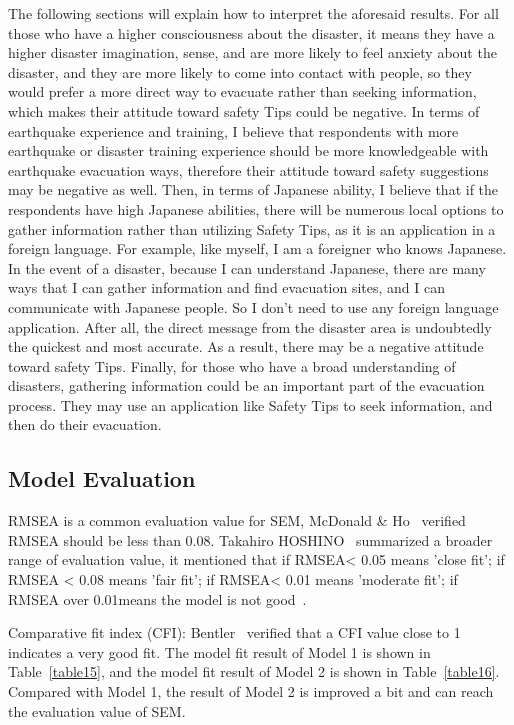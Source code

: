 The following sections will explain how to interpret the aforesaid results. For all those who have a higher consciousness about the disaster, it means they have a higher disaster imagination, sense, and are more likely to feel anxiety about the disaster, and they are more likely to come into contact with people, so they would prefer a more direct way to evacuate rather than seeking information, which makes their attitude toward safety Tips could be negative. In terms of earthquake experience and training, I believe that respondents with more earthquake or disaster training experience should be more knowledgeable with earthquake evacuation ways, therefore their attitude toward safety suggestions may be negative as well. Then, in terms of Japanese ability, I believe that if the respondents have high Japanese abilities, there will be numerous local options to gather information rather than utilizing Safety Tips, as it is an application in a foreign language. For example, like myself, I am a foreigner who knows Japanese. In the event of a disaster, because I can understand Japanese, there are many ways that I can gather information and find evacuation sites, and I can communicate with Japanese people. So I don't need to use any foreign language application. After all, the direct message from the disaster area is undoubtedly the quickest and most accurate. As a result, there may be a negative attitude toward safety Tips. Finally, for those who have a broad understanding of disasters, gathering information could be an important part of the evacuation process. They may use an application like Safety Tips to seek information, and then do their evacuation.

\subsection{Model Evaluation}
RMSEA is a common evaluation value for SEM, McDonald \& Ho~\cite{ref2} verified RMSEA should be less than 0.08. Takahiro HOSHINO~\cite{SEMres} summarized a broader range of evaluation value, it mentioned that if RMSEA< 0.05 means 'close fit'; if RMSEA < 0.08 means 'fair fit'; if RMSEA< 0.01 means 'moderate fit'; if RMSEA over 0.01means the model is not good~\cite{ref3,ref4,ref5}. 

Comparative fit index (CFI): Bentler~\cite{ref6} verified that a CFI value close to 1 indicates a very good fit.
The model fit result of Model 1 is shown in Table~\ref{table15}, and the model fit result of Model 2 is shown in Table~\ref{table16}. Compared with Model 1, the result of Model 2 is improved a bit and can reach the evaluation value of SEM.

